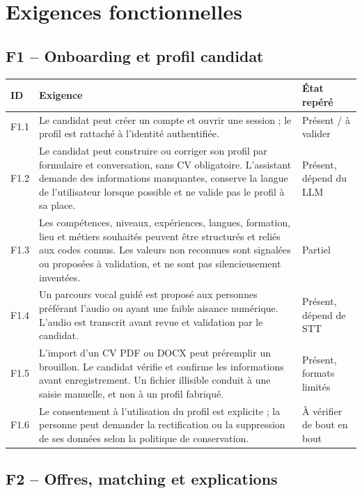 \documentclass[11pt,a4paper]{article}
\newcommand{\status}[1]{\textsf{\small #1}}
\begin{document}
\section{Exigences fonctionnelles}

\subsection{F1 -- Onboarding et profil candidat}

\begin{longtable}{>{\raggedright\arraybackslash}p{} >{\raggedright\arraybackslash}p{} >{\raggedright\arraybackslash}p{}}
\toprule
\textbf{ID} & \textbf{Exigence} & \textbf{État repéré}\\
\midrule
\endhead
F1.1 & Le candidat peut créer un compte et ouvrir une session ; le profil est rattaché à l'identité authentifiée. & \status{Présent / à valider}\\
F1.2 & Le candidat peut construire ou corriger son profil par formulaire et conversation, sans CV obligatoire. L'assistant demande des informations manquantes, conserve la langue de l'utilisateur lorsque possible et ne valide pas le profil à sa place. & \status{Présent, dépend du LLM}\\
F1.3 & Les compétences, niveaux, expériences, langues, formation, lieu et métiers souhaités peuvent être structurés et reliés aux codes connus. Les valeurs non reconnues sont signalées ou proposées à validation, et ne sont pas silencieusement inventées. & \status{Partiel}\\
F1.4 & Un parcours vocal guidé est proposé aux personnes préférant l'audio ou ayant une faible aisance numérique. L'audio est transcrit avant revue et validation par le candidat. & \status{Présent, dépend de STT}\\
F1.5 & L'import d'un CV PDF ou DOCX peut préremplir un brouillon. Le candidat vérifie et confirme les informations avant enregistrement. Un fichier illisible conduit à une saisie manuelle, et non à un profil fabriqué. & \status{Présent, formats limités}\\
F1.6 & Le consentement à l'utilisation du profil est explicite ; la personne peut demander la rectification ou la suppression de ses données selon la politique de conservation. & \status{À vérifier de bout en bout}\\
\bottomrule
\end{longtable}

\subsection{F2 -- Offres, matching et explications}
\end{document}
